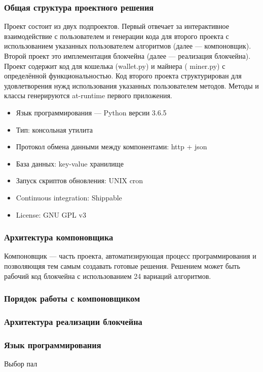 \subsubsection{Общая структура проектного решения}
Проект состоит из двух подпроектов. Первый отвечает за интерактивное
взаимодействие с пользователем и генерации кода для второго проекта с
использованием указанных пользователем алгоритмов (далее --- компоновщик).
Второй проект это имплементация блокчейна (далее --- реализация блокчейна).
Проект содержит код для кошелька ({\small wallet.py}) и майнера ({\small
miner.py}) с определённой функциональностью. Код второго проекта структурирован
для удовлетворения нужд использования указанных пользователем методов. Методы и
классы генерируются at-runtime первого приложения.

\begin{itemize}
    \item Язык программирования --- Python версии 3.6.5
    \item Тип: консольная утилита
    \item Протокол обмена данными между компонентами: http + json
    \item База данных: key-value хранилище
    \item Запуск скриптов обновления: UNIX cron
    \item Continuous integration: Shippable
    \item License: GNU GPL v3
\end{itemize}

\subsubsection{Архитектура компоновщика}
Компоновщик --- часть проекта, автоматизирующая процесс программирования и
позволяющяя тем самым создавать готовые решения. Решением может быть рабочий
код блокчейна с использованием 24 вариаций алгоритмов.
\subsubsection{Порядок работы с компоновщиком}
\subsubsection{Архитектура реализации блокчейна}


\subsubsection{Язык программирования}
Выбор пал
